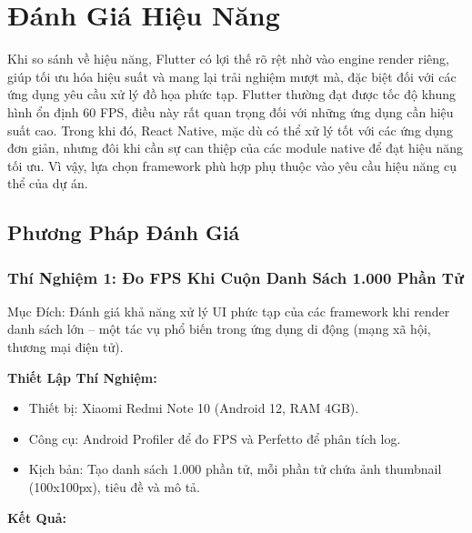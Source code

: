 \section{Đánh Giá Hiệu Năng}

  \hspace*{0.8cm}Khi so sánh về hiệu năng, Flutter có lợi thế rõ rệt nhờ vào engine render riêng, giúp tối ưu hóa hiệu suất và mang lại trải nghiệm mượt mà, đặc biệt đối với các ứng dụng yêu cầu xử lý đồ họa phức tạp. Flutter thường đạt được tốc độ khung hình ổn định 60 FPS, điều này rất quan trọng đối với những ứng dụng cần hiệu suất cao. Trong khi đó, React Native, mặc dù có thể xử lý tốt với các ứng dụng đơn giản, nhưng đôi khi cần sự can thiệp của các module native để đạt hiệu năng tối ưu. Vì vậy, lựa chọn framework phù hợp phụ thuộc vào yêu cầu hiệu năng cụ thể của dự án.
\vspace{0.5em}

\subsection{Phương Pháp Đánh Giá}
\renewcommand{\labelitemi}{--}    
\subsubsection{Thí Nghiệm 1: Đo FPS Khi Cuộn Danh Sách 1.000 Phần Tử}

  \hspace*{0.8cm}Mục Đích: Đánh giá khả năng xử lý UI phức tạp của các framework khi render danh sách lớn – một tác vụ phổ biến trong ứng dụng di động (mạng xã hội, thương mại điện tử).
\vspace{0.5em}


  \hspace*{0.8cm}\textbf{Thiết Lập Thí Nghiệm:}
  \setlength{\leftmargini}{1.5cm}
  \begin{itemize}
      \item Thiết bị: Xiaomi Redmi Note 10 (Android 12, RAM 4GB).
      \item Công cụ: Android Profiler để đo FPS và Perfetto để phân tích log.
      \item Kịch bản: Tạo danh sách 1.000 phần tử, mỗi phần tử chứa ảnh thumbnail (100x100px), tiêu đề và mô tả.
  \end{itemize}
\vspace{0.5em}

\vspace{0.5em}


  \hspace*{0.8cm}\textbf{Kết Quả:}
\vspace{0.5em}

